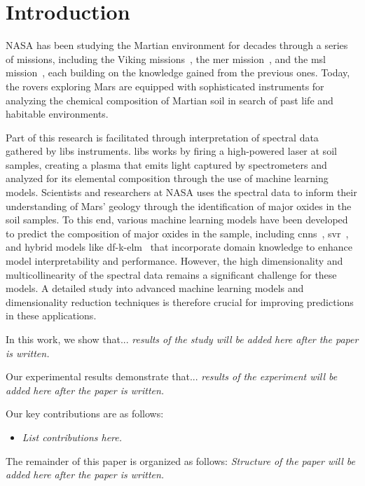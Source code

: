 \section{Introduction}\label{sec:introduction}

NASA has been studying the Martian environment for decades through a series of missions, including the Viking missions~\cite{marsnasagov_vikings}, the \gls{mer} mission~\cite{marsnasagov_observer, marsnasagov_spirit_opportunity}, and the \gls{msl} mission~\cite{marsnasagov_msl}, each building on the knowledge gained from the previous ones.
Today, the rovers exploring Mars are equipped with sophisticated instruments for analyzing the chemical composition of Martian soil in search of past life and habitable environments.

Part of this research is facilitated through interpretation of spectral data gathered  by \gls{libs} instruments.
\gls{libs} works by firing a high-powered laser at soil samples, creating a plasma that emits light captured by spectrometers and analyzed for its elemental composition through the use of machine learning models.
Scientists and researchers at NASA uses the spectral data to inform their understanding of Mars' geology through the identification of major oxides in the soil samples.
To this end, various machine learning models have been developed to predict the composition of major oxides in the sample, including \glspl{cnn}~\cite{yang_laser-induced_2022, yangConvolutionalNeuralNetwork2022}, \gls{svr}~\cite{rezaei_dimensionality_reduction}, and hybrid models like \gls{df}-\gls{k-elm}~\cite{song_DF-K-ELM} that incorporate domain knowledge to enhance model interpretability and performance.
However, the high dimensionality and multicollinearity of the spectral data remains a significant challenge for these models.
A detailed study into advanced machine learning models and dimensionality reduction techniques is therefore crucial for improving predictions in these applications.


In this work, we show that... \textit{results of the study will be added here after the paper is written.}

Our experimental results demonstrate that... \textit{results of the experiment will be added here after the paper is written.}

Our key contributions are as follows:
\begin{itemize}
	\item \textit{List contributions here.}
\end{itemize}


The remainder of this paper is organized as follows:
\textit{Structure of the paper will be added here after the paper is written.}
